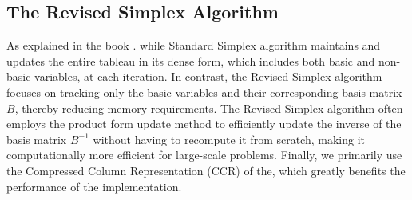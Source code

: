   \subsection{The Revised Simplex Algorithm}
  As explained in the book \parencite{chvatal1983linear}. 
  while Standard Simplex algorithm maintains and updates the entire tableau in its dense form,
   which includes both basic and non-basic variables, at each iteration. 
   In contrast, the Revised Simplex algorithm focuses on tracking only 
   the basic variables and their corresponding basis matrix $B$, 
   thereby reducing memory requirements. 
   The Revised Simplex algorithm often employs 
   the product form update method to efficiently 
   update the inverse of the basis matrix $B^{-1}$ 
   without having to recompute it from scratch, 
   making it computationally more efficient for large-scale problems. 
   Finally, we primarily use the Compressed Column Representation (CCR) of the, 
   which greatly benefits the performance of the implementation.

